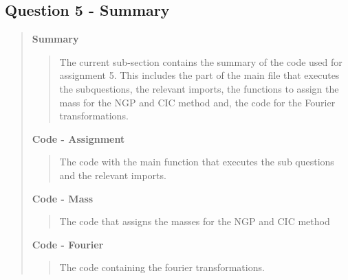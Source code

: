 
\subsection*{\textbf{Question 5 - Summary}}
\begin{quote}

\textbf{Summary}
\begin{quote}
The current sub-section contains the summary of the code used for assignment 5. This includes the part of the main file that executes the subquestions, the relevant imports, the functions to assign the mass for the NGP and CIC method and, the code for the Fourier transformations. %

\end{quote}


\textbf{Code - Assignment}

\begin{quote}
The code with the main function that executes the sub questions and the relevant imports.
\label{CODE:MAIN5}

\end{quote}

\textbf{Code - Mass} \\
\begin{quote}
The code that assigns the masses for the NGP and CIC method
\label{CODE:mass}

\end{quote}

\newpage
\textbf{Code - Fourier}
\begin{quote}
The code containing the fourier transformations.   

\label{CODE:fourier}
\end{quote}


\end{quote}


\newpage

%

%


%
\newpage











